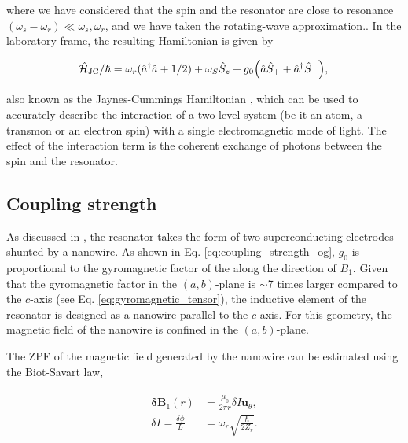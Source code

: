 where we have considered that the spin and the resonator are close to resonance $(\omega_{s}-\omega_{r}) \ll \omega_{s}, \omega_r$, and we have taken the rotating-wave approximation.. In the laboratory frame, the resulting Hamiltonian is given by

\begin{equation}
    \hat{\mathcal{H}}_{\text{JC}} / \hbar = \omega_r(\hat{a}^\dagger \hat{a} + 1/2) +  \omega_S \hat{S}_z + g_{0} \Big( \hat{a}\hat{S}_{+} + \hat{a}^{\dagger}\hat{S}_{-} \Big), \\
\end{equation}

\noindent also known as the Jaynes-Cummings Hamiltonian , which can be used to accurately describe the interaction of a two-level system (be it an atom, a transmon or an electron spin) with a single electromagnetic mode of light. The effect of the interaction term is the coherent exchange of photons between the spin and the resonator.

\subsection*{Coupling strength}

As discussed in , the resonator takes the form of two superconducting electrodes shunted by a nanowire. As shown in Eq. \ref{eq:coupling_strength_og}, $g_0$ is proportional to the gyromagnetic factor of the \Er along the direction of $B_1$. Given that the gyromagnetic factor in the $(a, b)$-plane is $\sim$7 times larger compared to the $c$-axis (see Eq. \ref{eq:gyromagnetic_tensor}), the inductive element of the resonator is designed as a nanowire parallel to the $c$-axis. For this geometry, the magnetic field of the nanowire is confined in the $(a, b)$-plane. 

The ZPF of the magnetic field generated by the nanowire can be estimated using the Biot-Savart law,

\begin{align}
\begin{split}
    \boldsymbol{\delta}\mathbf{B}_1(r) &= \frac{\mu_0}{2 \pi r} \delta I \mathbf{u}_\theta, \\
    \delta I = \frac{\delta \phi}{L} &= \omega_r \sqrt{\frac{\hbar}{2Z_r}}.
\end{split}
\end{align}

